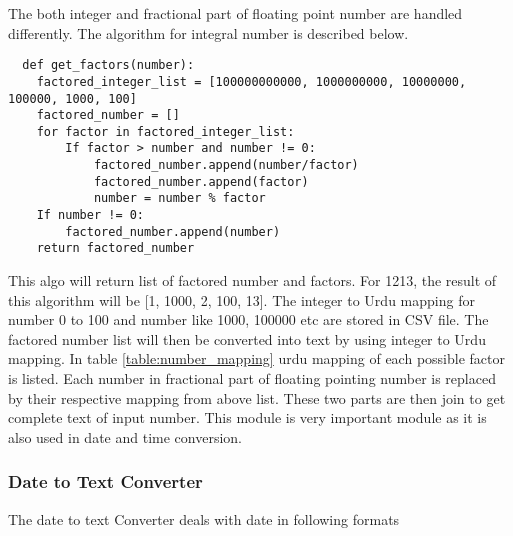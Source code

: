 The both integer and fractional part of floating point number are handled differently. The algorithm for integral number is described below.

\begin{verbatim}
  def get_factors(number):
    factored_integer_list = [100000000000, 1000000000, 10000000, 100000, 1000, 100]
    factored_number = []
    for factor in factored_integer_list:
        If factor > number and number != 0:
            factored_number.append(number/factor)
            factored_number.append(factor)
            number = number % factor  
    If number != 0:
        factored_number.append(number)
    return factored_number

\end{verbatim}

This algo will return list of factored number and factors. For 1213, the result of this algorithm will be 
[1, 1000, 2, 100, 13]. The integer to Urdu mapping for number 0 to 100 and number like 1000, 100000 etc are 
stored in CSV file. The factored number list will then be converted into text by using integer to Urdu mapping. In table \ref{table:number_mapping} urdu mapping 
of each possible factor is listed. Each number in fractional part of floating pointing number is replaced by their respective mapping from above list. 
These two parts are then join to get complete text of input number. This module is very important module as it is also used in date and time conversion.  

\subsubsection{Date to Text Converter}

The date to text Converter deals with date in following formats

